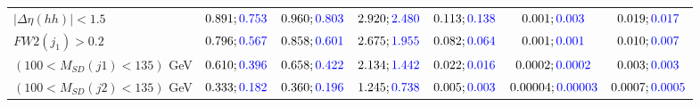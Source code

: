 \begin{landscape}
\begin{table}
\begin{tabular}{lcccccc}
			\rowcolor{black!7}$|\Delta\eta(hh)|<1.5$& $0.891;\textcolor{blue}{0.753}$&$0.960;\textcolor{blue}{0.803}$ &$2.920;\textcolor{blue}{2.480}$ &$0.113;\textcolor{blue}{0.138}$ &$0.001;\textcolor{blue}{0.003}$ &$0.019;\textcolor{blue}{0.017}$\\
			$FW2(j_1)>0.2$ &$0.796;\textcolor{blue}{0.567}$ &$0.858;\textcolor{blue}{0.601}$&$2.675;\textcolor{blue}{1.955}$&$0.082;\textcolor{blue}{0.064}$&$0.001;\textcolor{blue}{0.001}$&$0.010;\textcolor{blue}{0.007}$\\
			\rowcolor{black!7}$(100<M_{SD}(j1)<135)$ GeV& $0.610;\textcolor{blue}{0.396}$&$0.658;\textcolor{blue}{0.422}$&$2.134;\textcolor{blue}{1.442}$&$0.022;\textcolor{blue}{0.016}$&$0.0002;\textcolor{blue}{0.0002}$&$0.003;\textcolor{blue}{0.003}$\\
			$(100<M_{SD}(j2)<135)$ GeV &$0.333;\textcolor{blue}{0.182}$ &$0.360;\textcolor{blue}{0.196}$ &$1.245;\textcolor{blue}{0.738}$&$0.005;\textcolor{blue}{0.003}$&$0.00004;\textcolor{blue}{0.00003}$&$0.0007;\textcolor{blue}{0.0005}$\\
			\bottomrule
		\end{tabular}
	\end{table}
	

\end{landscape}
